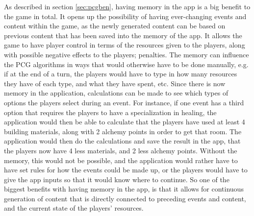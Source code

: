 As described in section \ref{sec:pcgben}, having memory in the app is a big benefit to the game in total.
It opens up the possibility of having ever-changing events and content within the game, as the newly generated content can be based on previous content that has been saved into the memory of the app.
It allows the game to have player control in terms of the resources given to the players, along with possible negative effects to the players; penalties. The memory can influence the PCG algorithms in ways that would otherwise have to be done manually, e.g. if at the end of a turn, the players would have to type in how many resources they have of each type, and what they have spent, etc.
Since there is now memory in the application, calculations can be made to see which types of options the players select during an event. For instance, if one event has a third option that requires the players to have a specialization in healing, the application would then be able to calculate that the players have used at least 4 building materials, along with 2 alchemy points in order to get that room. The application would then do the calculations and save the result in the app, that the players now have 4 less materials, and 2 less alchemy points. Without the memory, this would not be possible, and the application would rather have to have set rules for how the events could be made up, or the players would have to give the app inputs so that it would know where to continue.
So one of the biggest benefits with having memory in the app, is that it allows for continuous generation of content that is directly connected to preceding events and content, and the current state of the players' resources.
